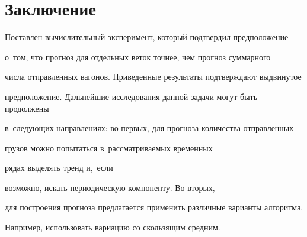 \section{Заключение}





Поставлен вычислительный эксперимент, который подтвердил предположение


о~том, что прогноз для отдельных веток точнее, чем прогноз суммарного


числа отправленных вагонов. Приведенные результаты подтверждают выдвинутое


предположение. Дальнейшие исследования данной задачи могут быть продолжены


в~следующих направлениях: во-пер\-вых, для прогноза количества отправленных


грузов можно попытаться в~рассматриваемых временн$\acute{\mbox{ы}}$х


рядах выделять тренд и,~если


возможно, искать периодическую компоненту. Во-вто\-рых,


для построения прогноза предлагается применить различные варианты алгоритма.


Например, использовать вариацию со скользящим средним.











